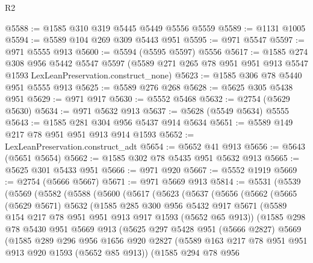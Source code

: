 \begin{lexlean}{R2}
\begin{coremodule}
@5588 := @1585 @310 @319 @5445 @5449 @5556 @5559
@5589 := @1131 @1005
@5594 := @5589 @104 @269 @309 @5443 @951
@5595 := @971 @5547
@5597 := @971 @5555 @913
@5600 := @5594 (@5595 @5597) @5556
@5617 := @1585
    @274
    @308
    @956
    @5442
    @5547
    @5597
    (@5589 @271 @265 @78 @951 @951 @913 @5547 @1593 LexLeanPreservation.construct_none)
@5623 := @1585 @306 @78 @5440 @951 @5555 @913
@5625 := @5589 @276 @268
@5628 := @5625 @305 @5438 @951
@5629 := @971 @917
@5630 := @5552 @5468
@5632 := @2754 (@5629 @5630)
@5634 := @971 @5632 @913
@5637 := @5628 (@5549 @5634) @5555
@5643 := @1585 @281 @304 @956 @5437 @914 @5634
@5651 := @5589 @149 @217 @78 @951 @951 @913 @914 @1593
@5652 := LexLeanPreservation.construct_adt
@5654 := @5652 @41 @913
@5656 := @5643 (@5651 @5654)
@5662 := @1585 @302 @78 @5435 @951 @5632 @913
@5665 := @5625 @301 @5433 @951
@5666 := @971 @920
@5667 := @5552 @1919
@5669 := @2754 (@5666 @5667)
@5671 := @971 @5669 @913
@5814 := @5531
    (@5539
      (@5569
        (@5582
          (@5588
            (@5600
              (@5617
                (@5623
                  (@5637
                    (@5656
                      (@5662
                        (@5665
                          (@5629 @5671)
                          @5632
                          (@1585
                            @285
                            @300
                            @956
                            @5432
                            @917
                            @5671
                            (@5589 @154 @217 @78 @951 @951 @913 @917 @1593 (@5652 @65 @913))
                            (@1585
                              @298
                              @78
                              @5430
                              @951
                              @5669
                              @913
                              (@5625
                                @297
                                @5428
                                @951
                                (@5666 @2827)
                                @5669
                                (@1585
                                  @289
                                  @296
                                  @956
                                  @1656
                                  @920
                                  @2827
                                  (@5589 @163 @217 @78 @951 @951 @913 @920 @1593 (@5652 @85 @913))
                                  (@1585
                                    @294
                                    @78
                                    @956

\end{coremodule}
\end{lexlean}
